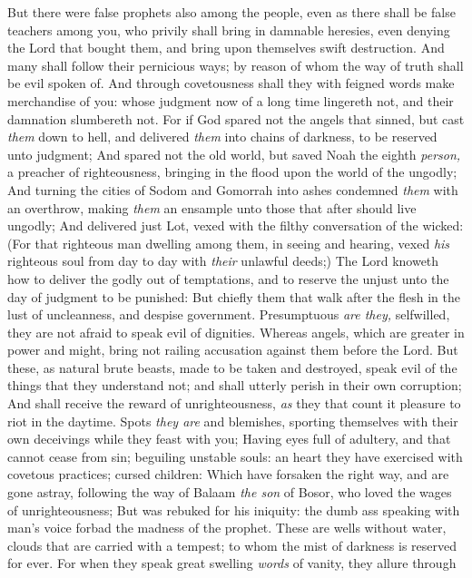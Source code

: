 \documentclass[11pt,letterpaper,oneside]{memoir}
\begin{document}
But there were false prophets also among the people, even as there shall
be false teachers among you, who privily shall bring in damnable
heresies, even denying the Lord that bought them, and bring upon
themselves swift destruction. And many shall follow their pernicious
ways; by reason of whom the way of truth shall be evil spoken of. And
through covetousness shall they with feigned words make merchandise of
you: whose judgment now of a long time lingereth not, and their
damnation slumbereth not. For if God spared not the angels that sinned,
but cast \emph{them} down to hell, and delivered \emph{them} into chains
of darkness, to be reserved unto judgment; And spared not the old world,
but saved Noah the eighth \emph{person,} a preacher of righteousness,
bringing in the flood upon the world of the ungodly; And turning the
cities of Sodom and Gomorrah into ashes condemned \emph{them} with an
overthrow, making \emph{them} an ensample unto those that after should
live ungodly; And delivered just Lot, vexed with the filthy conversation
of the wicked: (For that righteous man dwelling among them, in seeing
and hearing, vexed \emph{his} righteous soul from day to day with
\emph{their} unlawful deeds;) The Lord knoweth how to deliver the godly
out of temptations, and to reserve the unjust unto the day of judgment
to be punished: But chiefly them that walk after the flesh in the lust
of uncleanness, and despise government. Presumptuous \emph{are they,}
selfwilled, they are not afraid to speak evil of dignities. Whereas
angels, which are greater in power and might, bring not railing
accusation against them before the Lord. But these, as natural brute
beasts, made to be taken and destroyed, speak evil of the things that
they understand not; and shall utterly perish in their own corruption;
And shall receive the reward of unrighteousness, \emph{as} they that
count it pleasure to riot in the daytime. Spots \emph{they are} and
blemishes, sporting themselves with their own deceivings while they
feast with you; Having eyes full of adultery, and that cannot cease from
sin; beguiling unstable souls: an heart they have exercised with
covetous practices; cursed children: Which have forsaken the right way,
and are gone astray, following the way of Balaam \emph{the son} of
Bosor, who loved the wages of unrighteousness; But was rebuked for his
iniquity: the dumb ass speaking with man's voice forbad the madness of
the prophet. These are wells without water, clouds that are carried with
a tempest; to whom the mist of darkness is reserved for ever. For when
they speak great swelling \emph{words} of vanity, they allure through
\end{document}
